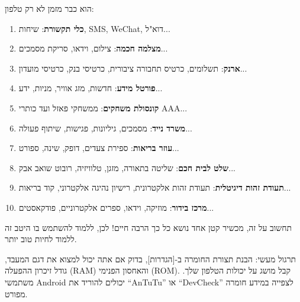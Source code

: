 
הוא כבר מזמן לא רק טלפון:

\begin{enumerate}
  \item \textbf{כלי תקשורת}: שיחות, SMS, WeChat, דוא"ל...
  \item \textbf{מצלמה חכמה}: צילום, וידאו, סריקת מסמכים...
  \item \textbf{ארנק}: תשלומים, כרטיס תחבורה ציבורית, כרטיסי בנק, כרטיסי מועדון...
  \item \textbf{פורטל מידע}: חדשות, מזג אוויר, מניות, ידע...
  \item \textbf{קונסולת משחקים}: ממשחקי פאזל ועד כותרי AAA...
  \item \textbf{משרד נייד}: מסמכים, גיליונות, פגישות, שיתוף פעולה...
  \item \textbf{עוזר בריאות}: ספירת צעדים, דופק, שינה, ספורט...
  \item \textbf{שלט לבית חכם}: שליטה בתאורה, מזגן, טלוויזיה, רובוט שואב אבק...
  \item \textbf{תעודת זהות דיגיטלית}: תעודת זהות אלקטרונית, רישיון נהיגה אלקטרוני, קוד בריאות...
  \item \textbf{מרכז בידור}: מוזיקה, וידאו, ספרים אלקטרוניים, פודקאסטים...
\end{enumerate}

תחשוב על זה, מכשיר קטן אחד נושא כל כך הרבה חיים! לכן, ללמוד להשתמש בו היטב זה ללמוד לחיות טוב יותר.

\begin{tcbpractice}{תרגול מעשי: הבנת תצורת החומרה}
ב-[הגדרות], בדוק אם אתה יכול למצוא את דגם המעבד, גודל זיכרון ההפעלה (RAM) והאחסון הפנימי (ROM). קבל מושג על יכולות הטלפון שלך. משתמשי Android יכולים להוריד את “AnTuTu” או “DevCheck” לצפייה במידע חומרה מפורט.

\end{tcbpractice}
